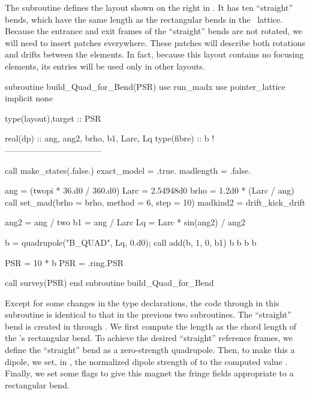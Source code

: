 %
The subroutine  defines the layout shown
on the right in . It has ten ``straight'' bends,
which have the same length as the rectangular bends in the
\PSR\ lattice. Because the entrance and exit frames of the ``straight''
bends are not rotated, we will need to insert patches everywhere.
These patches will describe both rotations and drifts between the
elements. In fact, because this layout contains no focusing elements,
its entries will be used only in other layouts.

\begin{ptccode}
subroutine  build_Quad_for_Bend(PSR)
use run_madx
use pointer_lattice
implicit none

type(layout),target :: PSR

real(dp) :: ang, ang2, brho, b1, Larc, Lq
type(fibre) :: b
!-----------------------------------

call make_states(.false.)
exact_model = .true.
madlength = .false.

ang = (twopi * 36.d0 / 360.d0)
Larc = 2.54948d0
brho = 1.2d0 * (Larc / ang)
call set_mad(brho = brho, method = 6, step = 10)
madkind2 = drift_kick_drift     \label{lin:qfb.same}

ang2 = ang / two                \label{lin:bptc.qfb.bend}
b1 = ang / Larc
Lq = Larc * sin(ang2) / ang2

b = quadrupole("B_QUAD", Lq, 0.d0);
call add(b, 1, 0, b1)           \label{lin:qfb.b1}
b%
b%
b%
b%

PSR = 10 * b
PSR = .ring.PSR

call survey(PSR)                \label{lin:qfb.survey}
end subroutine build_Quad_for_Bend
\end{ptccode}

Except for some changes in the type declarations, the code through
 in this subroutine is identical to that in the
previous two subroutines. The ``straight'' bend is created in
 through . We first
compute the length  as the chord length of the \PSR's
rectangular bend. To achieve the desired ``straight'' reference
frames, we define the ``straight'' bend as a zero-strength
quadrupole. Then, to make this a dipole, we set, in ,
the normalized dipole strength of  to the computed value
. Finally, we set some flags to give this magnet the fringe
fields appropriate to a rectangular bend.

